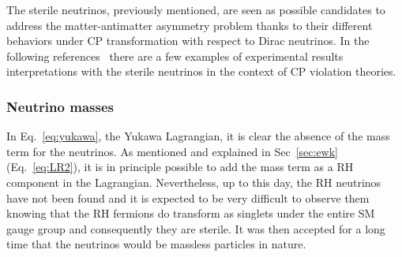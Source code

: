 The sterile neutrinos, previously mentioned, are seen as possible candidates to address the matter-antimatter asymmetry problem thanks to their different behaviors under CP transformation with respect to Dirac neutrinos. In the following references~\cite{Gandhi_2015,Klop_2015,Palazzo_2020}  there are a few examples of experimental results interpretations with the sterile neutrinos in the context of CP violation theories.

\subsubsection{Neutrino masses}
In Eq.~\ref{eq:yukawa}, the Yukawa Lagrangian, it is clear the absence of the mass term for the neutrinos. As mentioned and explained in Sec~\ref{sec:ewk} (Eq.~\ref{eq:LR2}), it is in principle possible to add the mass term as a RH component in the Lagrangian. Nevertheless, up to this day, the RH neutrinos have not been found and it is expected to be very difficult to observe them knowing that the RH fermions do transform as singlets under the entire SM gauge group and consequently they are sterile. It was then accepted for a long time that the neutrinos would be massless particles in nature.

